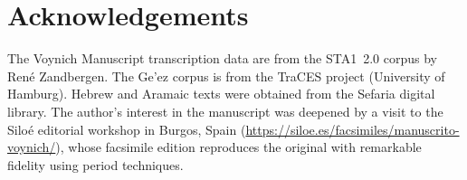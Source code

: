\section*{Acknowledgements}

The Voynich Manuscript transcription data are from the STA1~2.0 corpus by Ren\'e Zandbergen.  The Ge'ez corpus is from the TraCES project (University of Hamburg).  Hebrew and Aramaic texts were obtained from the Sefaria digital library.  The author's interest in the manuscript was deepened by a visit to the Silo\'e editorial workshop in Burgos, Spain (\url{https://siloe.es/facsimiles/manuscrito-voynich/}), whose facsimile edition reproduces the original with remarkable fidelity using period techniques.
